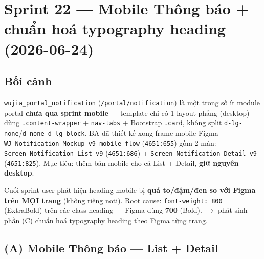 \chapter{Sprint 22 --- Mobile Thông báo + chuẩn hoá typography heading (2026-06-24)}

\section{Bối cảnh}

\texttt{wujia\_portal\_notification} (\texttt{/portal/notification}) là một trong số ít module portal
\textbf{chưa qua sprint mobile} --- template chỉ có 1 layout phẳng (desktop) dùng \texttt{.content-wrapper}
+ \texttt{nav-tabs} + Bootstrap \texttt{.card}, không split \texttt{d-lg-none}/\texttt{d-none d-lg-block}.
BA đã thiết kế xong frame mobile Figma \texttt{WJ\_Notification\_Mockup\_v9\_mobile\_flow} (\texttt{4651:655})
gồm 2 màn: \texttt{Screen\_Notification\_List\_v9} (\texttt{4651:686}) + \texttt{Screen\_Notification\_Detail\_v9}
(\texttt{4651:825}). Mục tiêu: thêm bản mobile cho cả List + Detail, \textbf{giữ nguyên desktop}.

Cuối sprint user phát hiện heading mobile bị \textbf{quá to/đậm/đen so với Figma trên MỌI trang} (không
riêng noti). Root cause: \texttt{font-weight: 800} (ExtraBold) trên các class heading --- Figma dùng
\textbf{700} (Bold). $\rightarrow$ phát sinh phần (C) chuẩn hoá typography heading theo Figma từng trang.

\section{(A) Mobile Thông báo --- List + Detail}

